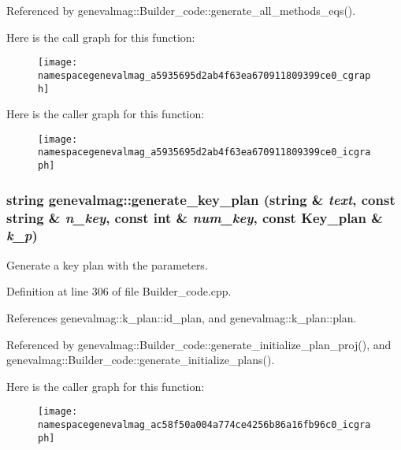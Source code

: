 Referenced by genevalmag::Builder\_\-code::generate\_\-all\_\-methods\_\-eqs().



Here is the call graph for this function:\nopagebreak
\begin{figure}[H]
\begin{center}
\leavevmode
\texttt{[image: namespacegenevalmag\_a5935695d2ab4f63ea670911809399ce0\_cgraph]}
\end{center}
\end{figure}




Here is the caller graph for this function:\nopagebreak
\begin{figure}[H]
\begin{center}
\leavevmode
\texttt{[image: namespacegenevalmag\_a5935695d2ab4f63ea670911809399ce0\_icgraph]}
\end{center}
\end{figure}


\hypertarget{namespacegenevalmag_ac58f50a004a774ce4256b86a16fb96c0}{
\subsubsection[{generate\_\-key\_\-plan}]{\setlength{\rightskip}{0pt plus 5cm}string genevalmag::generate\_\-key\_\-plan (string \& {\em text}, \/  const string \& {\em n\_\-key}, \/  const int \& {\em num\_\-key}, \/  const Key\_\-plan \& {\em k\_\-p})}}
\label{namespacegenevalmag_ac58f50a004a774ce4256b86a16fb96c0}
Generate a key plan with the parameters. 

Definition at line 306 of file Builder\_\-code.cpp.



References genevalmag::k\_\-plan::id\_\-plan, and genevalmag::k\_\-plan::plan.



Referenced by genevalmag::Builder\_\-code::generate\_\-initialize\_\-plan\_\-proj(), and genevalmag::Builder\_\-code::generate\_\-initialize\_\-plans().



Here is the caller graph for this function:\nopagebreak
\begin{figure}[H]
\begin{center}
\leavevmode
\texttt{[image: namespacegenevalmag\_ac58f50a004a774ce4256b86a16fb96c0\_icgraph]}
\end{center}
\end{figure}


